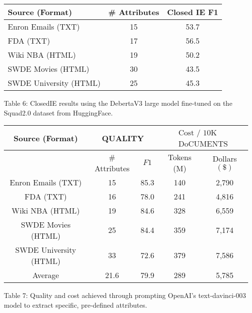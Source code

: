 \documentclass[10pt]{article}
\begin{document}
\begin{center}
\begin{tabular}{lcc}
\hline
Source (Format) & \# Attributes & Closed IE F1 \\
\hline
Enron Emails (TXT) & 15 & 53.7 \\
FDA (TXT) & 17 & 56.5 \\
Wiki NBA (HTML) & 19 & 50.2 \\
SWDE Movies (HTML) & 30 & 43.5 \\
SWDE University (HTML) & 25 & 45.3 \\
\hline
\end{tabular}
\end{center}

Table 6: ClosedIE results using the DebertaV3 large model fine-tuned on the Squad2.0 dataset from HuggingFace.

\begin{center}
\begin{tabular}{|c|c|c|c|c|}
\hline
\multirow[t]{2}{*}{Source (Format)} & \multicolumn{2}{|c|}{QUALITY} & \multicolumn{2}{|c|}{$\begin{array}{c}\text { Cost / 10K } \\
\text { DoCUMENTS }\end{array}$} \\
\hline
 & \# Attributes & $F 1$ & Tokens (M) & Dollars $(\$)$ \\
\hline
Enron Emails (TXT) & 15 & 85.3 & 140 & 2,790 \\
\hline
FDA (TXT) & 16 & 78.0 & 241 & 4,816 \\
\hline
Wiki NBA (HTML) & 19 & 84.6 & 328 & 6,559 \\
\hline
SWDE Movies (HTML) & 25 & 84.4 & 359 & 7,174 \\
\hline
SWDE University (HTML) & 33 & 72.6 & 379 & 7,586 \\
\hline
Average & 21.6 & 79.9 & 289 & 5,785 \\
\hline
\end{tabular}
\end{center}

Table 7: Quality and cost achieved through prompting OpenAI's text-davinci-003 model to extract specific, pre-defined attributes.
\end{document}
